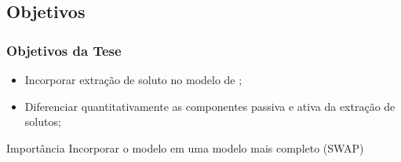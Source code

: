
\subsection{Objetivos}
\begin{frame}\frametitle{Objetivos da Tese}
  \begin{itemize}
  \item Incorporar extração de soluto no modelo de \cite{liersolute};
  \item Diferenciar quantitativamente as componentes passiva e ativa da extração de solutos;
  \end{itemize}
  \begin{block}{Importância}
    Incorporar o modelo em uma modelo mais completo (SWAP)
  \end{block}
\end{frame}


